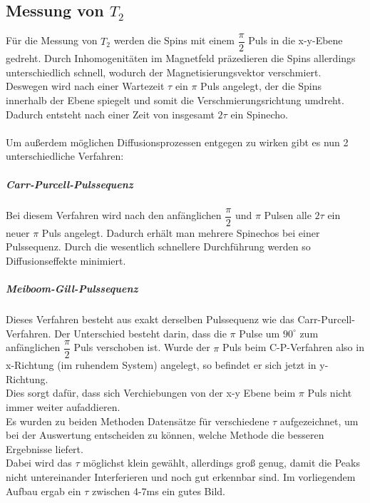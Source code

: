 \documentclass[12pt,a4paper]{article}
\begin{document}
\subsection{Messung von $T_2$}

Für die Messung von $T_2$ werden die Spins mit einem  $\dfrac{\pi}{2}$ Puls in die x-y-Ebene gedreht. Durch Inhomogenitäten im Magnetfeld präzedieren die Spins allerdings unterschiedlich schnell, wodurch der Magnetisierungsvektor verschmiert. Deswegen wird nach einer Wartezeit $\tau$ ein $\pi$ Puls angelegt, der die Spins innerhalb der Ebene spiegelt und somit die Verschmierungsrichtung umdreht. Dadurch entsteht nach einer Zeit von insgesamt $2 \tau$ ein Spinecho. \\ 
\\
Um außerdem möglichen Diffusionsprozessen entgegen zu wirken gibt es nun 2 unterschiedliche Verfahren:

\subparagraph{Carr-Purcell-Pulssequenz}
Bei diesem Verfahren wird nach den anfänglichen $\dfrac{\pi}{2}$ und $\pi$ Pulsen alle  $2 \tau$ ein neuer $\pi$ Puls angelegt. Dadurch erhält man mehrere Spinechos bei einer Pulssequenz. Durch die wesentlich schnellere Durchführung werden so Diffusionseffekte minimiert.
\subparagraph{Meiboom-Gill-Pulssequenz}
Dieses Verfahren besteht aus exakt derselben Pulssequenz wie das Carr-Purcell-Verfahren. Der  Unterschied besteht darin, dass  die $\pi$ Pulse um $90^{\circ}$ zum anfänglichen $\dfrac{\pi}{2}$ Puls verschoben ist. Wurde der $\pi$ Puls beim C-P-Verfahren also in x-Richtung (im ruhendem System) angelegt, so befindet er sich jetzt in y-Richtung.\\
Dies sorgt dafür, dass sich Verchiebungen von der x-y Ebene beim $\pi$ Puls nicht immer weiter aufaddieren.
\\
Es wurden zu beiden Methoden Datensätze für verschiedene $\tau$ aufgezeichnet, um bei der Auswertung entscheiden zu können, welche Methode die besseren Ergebnisse liefert.\\
Dabei wird das $\tau$ möglichst klein gewählt, allerdings groß genug, damit die Peaks nicht untereinander Interferieren und noch gut erkennbar sind. Im vorliegendem Aufbau ergab ein $\tau$ zwischen 4-7ms ein gutes Bild.\\
\end{document}
